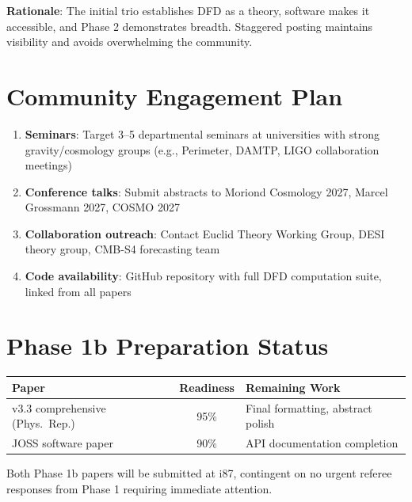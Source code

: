 \documentclass[11pt,a4paper]{article}
\begin{document}
\textbf{Rationale}: The initial trio establishes DFD as a theory, software makes it accessible, and Phase 2 demonstrates breadth. Staggered posting maintains visibility and avoids overwhelming the community.

\section{Community Engagement Plan}

\begin{enumerate}[nosep]
\item \textbf{Seminars}: Target 3--5 departmental seminars at universities with strong gravity/cosmology groups (e.g., Perimeter, DAMTP, LIGO collaboration meetings)
\item \textbf{Conference talks}: Submit abstracts to Moriond Cosmology 2027, Marcel Grossmann 2027, COSMO 2027
\item \textbf{Collaboration outreach}: Contact Euclid Theory Working Group, DESI theory group, CMB-S4 forecasting team
\item \textbf{Code availability}: GitHub repository with full DFD computation suite, linked from all papers
\end{enumerate}

\section{Phase 1b Preparation Status}

\begin{center}
\begin{tabular}{lcl}
\toprule
\textbf{Paper} & \textbf{Readiness} & \textbf{Remaining Work} \\
\midrule
v3.3 comprehensive (Phys.\ Rep.) & 95\% & Final formatting, abstract polish \\
JOSS software paper & 90\% & API documentation completion \\
\bottomrule
\end{tabular}
\end{center}

Both Phase 1b papers will be submitted at i87, contingent on no urgent referee responses from Phase 1 requiring immediate attention.
\end{document}
